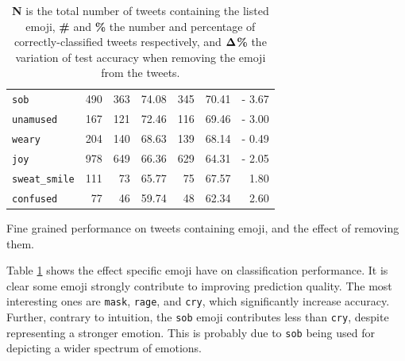 \documentclass[11pt,a4paper]{article}
\begin{document}
\begin{table}[!h]
\begin{tabular}{lrrcrcr}
          \texttt{sob}          & 490   \hspace{0.1cm} & 363 & 74.08 \hspace{0.1cm} & 345 & 70.41 & - 3.67  \\
          \texttt{unamused}     & 167   \hspace{0.1cm} & 121 & 72.46 \hspace{0.1cm} & 116 & 69.46 & - 3.00  \\
          \midrule[0.001em]
          \texttt{weary}        & 204   \hspace{0.1cm} & 140 & 68.63 \hspace{0.1cm} & 139 & 68.14 & - 0.49  \\
          \texttt{joy}          & 978   \hspace{0.1cm} & 649 & 66.36 \hspace{0.1cm} & 629 & 64.31 & - 2.05  \\
          \texttt{sweat\_smile} & 111   \hspace{0.1cm} & 73  & 65.77 \hspace{0.1cm} & 75  & 67.57 & 1.80 \\
          \texttt{confused}     & 77    \hspace{0.1cm} & 46  & 59.74 \hspace{0.1cm} & 48  & 62.34 & 2.60 \\
          \bottomrule

        \end{tabular}


    \caption{Fine grained performance on tweets containing emoji, and the effect
of removing them.} 
    \vspace{-0.4cm}
    \caption*{
        \footnotesize \textbf{N} is the total number of tweets containing the listed emoji,
        \textbf{\#} and \textbf{\%} the number and percentage of correctly-classified
        tweets respectively, and $\bf{\Delta}$\textbf{\%} the variation of test accuracy
        when removing the emoji from the tweets.}

    \label{table:emoji_fine_grained}

\end{table}

Table \ref{table:emoji_fine_grained} shows the effect specific emoji have on
classification performance. It is clear some emoji strongly contribute to improving prediction quality. The
most interesting ones are \texttt{mask}, \texttt{rage}, and \texttt{cry}, which
significantly increase accuracy. Further, contrary to intuition, the
\texttt{sob} emoji contributes less than \texttt{cry}, despite representing a
stronger emotion. This is probably due to \texttt{sob} being used for depicting
a wider spectrum of emotions.
\end{document}
